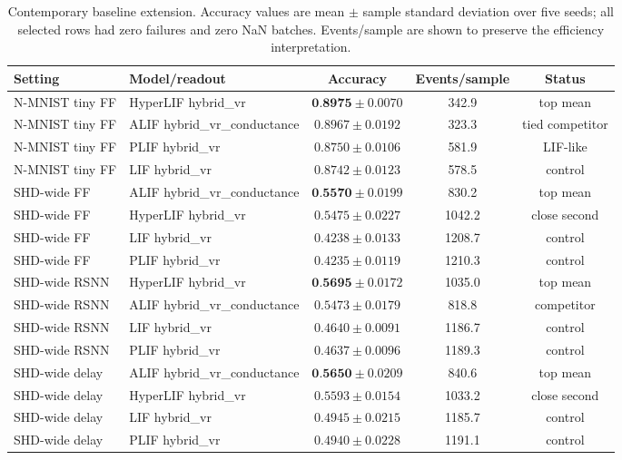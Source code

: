 \documentclass[journal]{IEEEtran}
\newcommand{\hlif}{HyperLIF}
\newcommand{\lif}{LIF}
\newcommand{\plif}{PLIF}
\newcommand{\alif}{ALIF}
\begin{document}
\begin{table}[t]
\centering
\caption{Contemporary baseline extension. Accuracy values are mean $\pm$ sample standard deviation over five seeds; all selected rows had zero failures and zero NaN batches. Events/sample are shown to preserve the efficiency interpretation.}
\label{tab:baseline-shortlist}
\footnotesize
\begin{tabular}{llccc}
\toprule
Setting & Model/readout & Accuracy & Events/sample & Status \\
\midrule
N-MNIST tiny FF & \hlif{} hybrid\_vr & $\textbf{0.8975} \pm 0.0070$ & 342.9 & top mean \\
N-MNIST tiny FF & \alif{} hybrid\_vr\_conductance & $0.8967 \pm 0.0192$ & 323.3 & tied competitor \\
N-MNIST tiny FF & \plif{} hybrid\_vr & $0.8750 \pm 0.0106$ & 581.9 & LIF-like \\
N-MNIST tiny FF & \lif{} hybrid\_vr & $0.8742 \pm 0.0123$ & 578.5 & control \\
\midrule
SHD-wide FF & \alif{} hybrid\_vr\_conductance & $\textbf{0.5570} \pm 0.0199$ & 830.2 & top mean \\
SHD-wide FF & \hlif{} hybrid\_vr & $0.5475 \pm 0.0227$ & 1042.2 & close second \\
SHD-wide FF & \lif{} hybrid\_vr & $0.4238 \pm 0.0133$ & 1208.7 & control \\
SHD-wide FF & \plif{} hybrid\_vr & $0.4235 \pm 0.0119$ & 1210.3 & control \\
\midrule
SHD-wide RSNN & \hlif{} hybrid\_vr & $\textbf{0.5695} \pm 0.0172$ & 1035.0 & top mean \\
SHD-wide RSNN & \alif{} hybrid\_vr\_conductance & $0.5473 \pm 0.0179$ & 818.8 & competitor \\
SHD-wide RSNN & \lif{} hybrid\_vr & $0.4640 \pm 0.0091$ & 1186.7 & control \\
SHD-wide RSNN & \plif{} hybrid\_vr & $0.4637 \pm 0.0096$ & 1189.3 & control \\
\midrule
SHD-wide delay & \alif{} hybrid\_vr\_conductance & $\textbf{0.5650} \pm 0.0209$ & 840.6 & top mean \\
SHD-wide delay & \hlif{} hybrid\_vr & $0.5593 \pm 0.0154$ & 1033.2 & close second \\
SHD-wide delay & \lif{} hybrid\_vr & $0.4945 \pm 0.0215$ & 1185.7 & control \\
SHD-wide delay & \plif{} hybrid\_vr & $0.4940 \pm 0.0228$ & 1191.1 & control \\
\bottomrule
\end{tabular}
\end{table}
\end{document}
